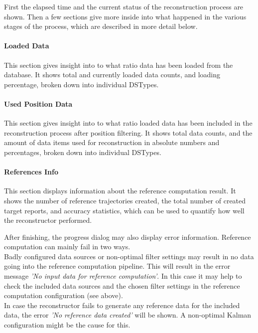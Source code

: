 First the elapsed time and the current status of the reconstruction process are shown.
Then a few sections give more inside into what happened in the various stages of the process, 
which are described in more detail below.

\paragraph{Loaded Data} This section gives insight into to what ratio data has been loaded from
the database. It shows total and currently loaded data counts, and loading percentage, broken down into
individual DSTypes.

\paragraph{Used Position Data} This section gives insight into to what ratio loaded data has been
included in the reconstruction process after position filtering. 
It shows total data counts, and the amount of data items used for reconstruction in absolute numbers and percentages,
broken down into individual DSTypes.

\paragraph{References Info} This section displays information about the reference computation result.
It shows the number of reference trajectories created, the total number of created target reports, and 
accuracy statistics, which can be used to quantify how well the reconstructor performed.

After finishing, the progress dialog may also display error information. Reference computation can mainly fail in two ways. \\

Badly configured data sources or non-optimal filter settings may result in no data going into the reference computation pipeline.
This will result in the error message \textit{'No input data for reference computation'}. In this case it may help to 
check the included data sources and the chosen filter settings in the reference computation configuration (see above). \\

In case the reconstructor fails to generate any reference data for the included data, the error 
\textit{'No reference data created'} will be shown. A non-optimal Kalman configuration might be the cause for this.

